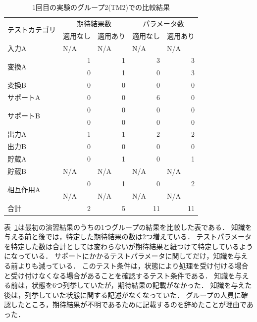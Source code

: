 \begin{table}[htbp]
  \centering
  \caption{1回目の実験のグループ2(TM2)での比較結果 }
    \begin{tabular}{|l|r|r|r|r|}
    \hline
    \multirow{2}[4]{*}{テストカテゴリ} & \multicolumn{2}{c|}{期待結果数} & \multicolumn{2}{c|}{パラメータ数} \bigstrut\\
\cline{2-5}          & \multicolumn{1}{l|}{適用なし} & \multicolumn{1}{l|}{適用あり} & \multicolumn{1}{l|}{適用なし} & \multicolumn{1}{l|}{適用あり} \bigstrut\\
    \hline
    入力A   & \multicolumn{1}{l|}{N/A} & \multicolumn{1}{l|}{N/A} & \multicolumn{1}{l|}{N/A} & \multicolumn{1}{l|}{N/A} \bigstrut\\
    \hline
    \multirow{2}[4]{*}{変換A} & 1     & 1     & 3     & 3 \bigstrut\\
\cline{2-5}          & 0     & 1     & 0     & 3 \bigstrut\\
    \hline
    変換B   & 0     & 0     & 0     & 0 \bigstrut\\
    \hline
    サポートA & 0     & 0     & 6     & 0 \bigstrut\\
    \hline
    \multirow{2}[4]{*}{サポートB} & 0     & 0     & 0     & 0 \bigstrut\\
\cline{2-5}          & 0     & 0     & 0     & 0 \bigstrut\\
    \hline
    出力A   & 1     & 1     & 2     & 2 \bigstrut\\
    \hline
    出力B   & 0     & 0     & 0     & 0 \bigstrut\\
    \hline
    貯蔵A   & 0     & 1     & 0     & 1 \bigstrut\\
    \hline
    貯蔵B   & \multicolumn{1}{l|}{N/A} & \multicolumn{1}{l|}{N/A} & \multicolumn{1}{l|}{N/A} & \multicolumn{1}{l|}{N/A} \bigstrut\\
    \hline
    \multirow{2}[4]{*}{相互作用A} & 0     & 1     & 0     & 2 \bigstrut\\
\cline{2-5}          & \multicolumn{1}{l|}{N/A} & \multicolumn{1}{l|}{N/A} & \multicolumn{1}{l|}{N/A} & \multicolumn{1}{l|}{N/A} \bigstrut\\
    \hline
    合計    & 2     & 5     & 11    & 11 \bigstrut\\
    \hline
    \end{tabular}%
  \label{tab:D-3-tab3}%
\end{table}%

表~\ref{tab:D-3-tab3}は最初の演習結果のうちの1つグループの結果を比較した表である．
知識を与える前と後では，特定した期待結果の数は2つ増えている．
テストパラメータを特定した数は合計としては変わらないが期待結果と紐つけて特定しているようになっている．
サポートにかかるテストパラメータに関してだけ，知識を与える前よりも減っている．
このテスト条件は，状態により処理を受け付ける場合と受け付けなくなる場合があることを確認するテスト条件である．
知識を与える前は，状態を6つ列挙していたが，期待結果の記載がなかった．
知識を与えた後は，列挙していた状態に関する記述がなくなっていた．
グループの人員に確認したところ，期待結果が不明であるために記載するのを辞めたことが理由であった．

